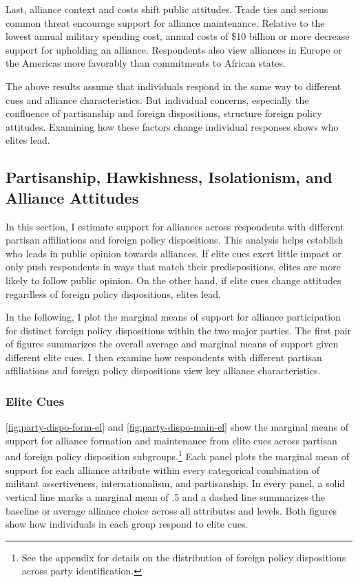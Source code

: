 \documentclass[12pt]{article}
\begin{document}
Last, alliance context and costs shift public attitudes. 
Trade ties and serious common threat encourage support for alliance maintenance. 
Relative to the lowest annual military spending cost, annual costs of \$10 billion or more decrease support for upholding an alliance.  
Respondents also view alliances in Europe or the Americas more favorably than commitments to African states. 


The above results assume that individuals respond in the same way to different cues and alliance characteristics. 
But individual concerns, especially the confluence of partisanship and foreign dispositions, structure foreign policy attitudes.
Examining how these factors change individual responses shows who elites lead.  



\subsection{Partisanship, Hawkishness, Isolationism, and Alliance Attitudes}



In this section, I estimate support for alliances across respondents with different partisan affiliations and foreign policy dispositions.  
This analysis helps establish who leads in public opinion towards alliances. 
If elite cues exert little impact or only push respondents in ways that match their predispositions, elites are more likely to follow public opinion. 
On the other hand, if elite cues change attitudes regardless of foreign policy dispositions, elites lead. 


In the following, I plot the marginal means of support for alliance participation for distinct foreign policy dispositions within the two major parties.  
The first pair of figures summarizes the overall average and marginal means of support given different elite cues. 
I then examine how respondents with different partisan affiliations and foreign policy dispositions view key alliance characteristics. 


\subsubsection{Elite Cues}


\autoref{fig:party-dispo-form-el} and \autoref{fig:party-dispo-main-el} show the marginal means of support for alliance formation and maintenance from elite cues across partisan and foreign policy disposition subgroups.\footnote{See the appendix for details on the distribution of foreign policy dispositions across party identification.} 
Each panel plots the marginal mean of support for each alliance attribute within every categorical combination of militant assertiveness, internationalism, and partisanship.
In every panel, a solid vertical line marks a marginal mean of .5 and a dashed line summarizes the baseline or average alliance choice across all attributes and levels.  
Both figures show how individuals in each group respond to elite cues. 
\end{document}
